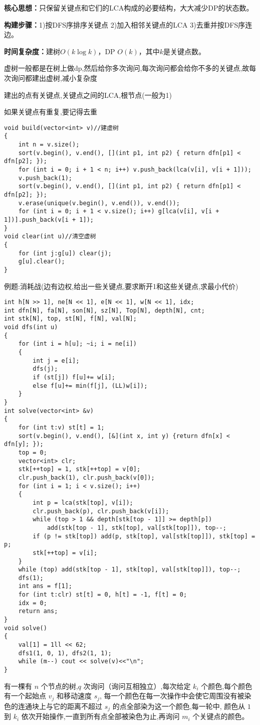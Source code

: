 \documentclass[a4paper,fontset=none]{ctexart}
\begin{document}
\textbf{核心思想：}只保留关键点和它们的LCA构成的必要结构，大大减少DP的状态数。

\textbf{构建步骤：}1)按DFS序排序关键点 2)加入相邻关键点的LCA 3)去重并按DFS序连边。

\textbf{时间复杂度：}建树$O(k\log k)$，DP $O(k)$，其中$k$是关键点数。

虚树一般都是在树上做dp,然后给你多次询问,每次询问都会给你不多的关键点,故每次询问都建出虚树,减小复杂度

建出的点有关键点,关键点之间的LCA,根节点(一般为1)

如果关键点有重复,要记得去重

\begin{verbatim}
void build(vector<int> v)//建虚树
{
    int n = v.size();
    sort(v.begin(), v.end(), [](int p1, int p2) { return dfn[p1] < dfn[p2]; });
    for (int i = 0; i + 1 < n; i++) v.push_back(lca(v[i], v[i + 1]));
    v.push_back(1);
    sort(v.begin(), v.end(), [](int p1, int p2) { return dfn[p1] < dfn[p2]; });
    v.erase(unique(v.begin(), v.end()), v.end());
    for (int i = 0; i + 1 < v.size(); i++) g[lca(v[i], v[i + 1])].push_back(v[i + 1]);
}
void clear(int u)//清空虚树
{
    for (int j:g[u]) clear(j);
    g[u].clear();
}
\end{verbatim}


例题:消耗战(边有边权,给出一些关键点,要求断开1和这些关键点,求最小代价)

\begin{verbatim}
int h[N >> 1], ne[N << 1], e[N << 1], w[N << 1], idx;
int dfn[N], fa[N], son[N], sz[N], Top[N], depth[N], cnt;
int stk[N], top, st[N], f[N], val[N];
void dfs(int u)
{
    for (int i = h[u]; ~i; i = ne[i])
    {
        int j = e[i];
        dfs(j);
        if (st[j]) f[u]+= w[i];
        else f[u]+= min(f[j], (LL)w[i]);
    }
}
int solve(vector<int> &v)
{
    for (int t:v) st[t] = 1;
    sort(v.begin(), v.end(), [&](int x, int y) {return dfn[x] < dfn[y]; });
    top = 0;
    vector<int> clr;
    stk[++top] = 1, stk[++top] = v[0];
    clr.push_back(1), clr.push_back(v[0]);
    for (int i = 1; i < v.size(); i++)
    {
        int p = lca(stk[top], v[i]);
        clr.push_back(p), clr.push_back(v[i]);
        while (top > 1 && depth[stk[top - 1]] >= depth[p])
            add(stk[top - 1], stk[top], val[stk[top]]), top--;
        if (p != stk[top]) add(p, stk[top], val[stk[top]]), stk[top] = p;
        stk[++top] = v[i];
    }
    while (top) add(stk[top - 1], stk[top], val[stk[top]]), top--;
    dfs(1);
    int ans = f[1];
    for (int t:clr) st[t] = 0, h[t] = -1, f[t] = 0;
    idx = 0;
    return ans;
}
void solve()
{
    val[1] = 1ll << 62;
    dfs1(1, 0, 1), dfs2(1, 1);
    while (m--) cout << solve(v)<<"\n";
}
\end{verbatim}
有一棵有 $n$ 个节点的树,$q$ 次询问（询问互相独立）,每次给定 $k_i$ 个颜色,每个颜色有一个起始点 $v_j$ 和移动速度 $s_j$,
每一个颜色在每一次操作中会使它周围没有被染色的连通块上与它的距离不超过 $s_j$ 的点全部染为这一个颜色,每一轮中,
颜色从 $1$ 到 $k_i$ 依次开始操作,一直到所有点全部被染色为止,再询问 $m_i$ 个关键点的颜色。
\end{document}
